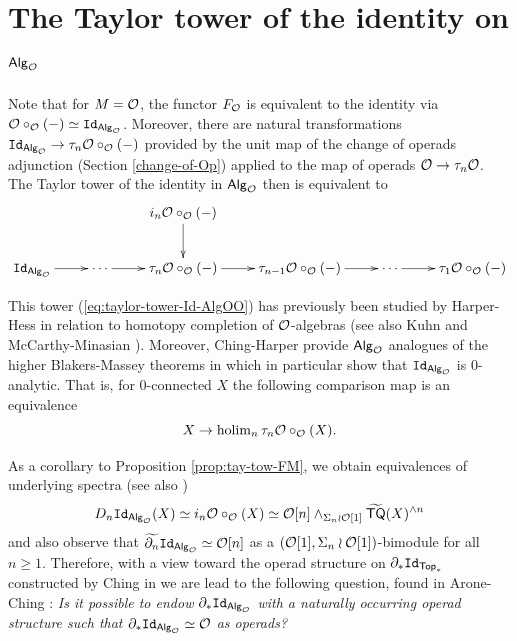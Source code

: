 \section{The Taylor tower of the identity on ${\mathsf{Alg}_{\mathcal{O}}}$}
Note that for $M=\mathcal{O}$, the functor $F_{\mathcal{O}}$ is equivalent to the identity via $\mathcal{O} \circ_{\mathcal{O}} (-)\simeq \mathtt{Id}_{{\mathsf{Alg}_{\mathcal{O}}}}$. Moreover, there are natural transformations $\mathtt{Id}_{{\mathsf{Alg}_{\mathcal{O}}}} \to \tau_n \mathcal{O}\circ_{\mathcal{O}}(-)$ provided by the unit map of the change of operads adjunction (Section \ref{change-of-Op}) applied to the map of operads $\mathcal{O}\to \tau_n \mathcal{O}$. The Taylor tower of the identity in ${\mathsf{Alg}_{\mathcal{O}}}$ then is equivalent to 
\begin{equation}\label{eq:taylor-tower-Id-AlgOO}
    \xymatrix{
    && i_n \Cal{O} \circ_{\Cal{O}}(-) \ar[d] & & 
    \\
    \Id_{\Alg{O}}\ar[r] & 
    \cdots \ar[r] & 
    \tau_n\Cal{O}\circ_{\Cal{O}} (-) \ar[r] & 
    \tau_{n-1}\Cal{O}\circ_{\Cal{O}}(-) \ar[r] & \cdots \ar[r] & \tau_1\Cal{O}\circ_{\Cal{O}}(-)
    }
\end{equation}

This tower (\ref{eq:taylor-tower-Id-AlgOO}) has previously been studied by Harper-Hess \cite{Har-Hess} in relation to homotopy completion of $\mathcal{O}$-algebras (see also Kuhn \cite{Kuh} and McCarthy-Minasian \cite{MM}). Moreover, Ching-Harper provide ${\mathsf{Alg}_{\mathcal{O}}}$ analogues of the higher Blakers-Massey theorems in \cite{Ching-Harper-BM}  which in particular show that $\mathtt{Id}_{{\mathsf{Alg}_{\mathcal{O}}}}$ is $0$-analytic. That is, for $0$-connected $X$ the following comparison map is an equivalence \[X \to \operatorname{holim}_n \tau_n \mathcal{O} \circ_{\mathcal{O}}(X).\] 

As a corollary to Proposition \ref{prop:tay-tow-FM}, we obtain equivalences of underlying spectra (see also \cite{Har-Hess}) \[
    D_n \mathtt{Id}_{{\mathsf{Alg}_{\mathcal{O}}}}(X)\simeq i_n \mathcal{O} \circ_{\mathcal{O}}(X)\simeq \mathcal{O}[n] \wedge_{\Sigma_n \wr \mathcal{O}[1]} \widetilde{\mathsf{TQ}}(X)^{\wedge n}\] 
and also observe that $\widetilde{\partial_n} \mathtt{Id}_{{\mathsf{Alg}_{\mathcal{O}}}}\simeq \mathcal{O}[n]$ as a $(\mathcal{O}[1], \Sigma_n \wr \mathcal{O}[1])$-bimodule for all $n\geq 1$. Therefore, with a view toward the operad structure on $\partial_*\mathtt{Id}_{\mathsf{Top}_*}$ constructed by Ching in \cite{Ching-thesis} we are lead to the following question, found in Arone-Ching \cite{AC-1}: \textit{Is it possible to endow $\partial_* \mathtt{Id}_{{\mathsf{Alg}_{\mathcal{O}}}}$ with a naturally occurring operad structure such that $\partial_* \mathtt{Id}_{{\mathsf{Alg}_{\mathcal{O}}}}\simeq \mathcal{O}$ \textit{as operads}?}

